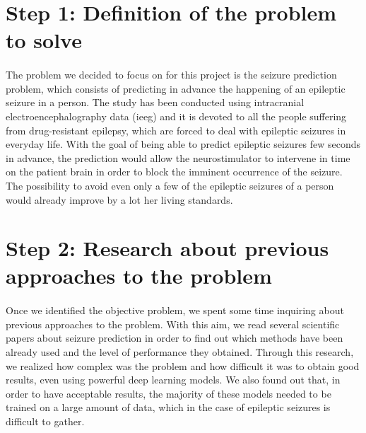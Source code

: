 
\section{Step 1: Definition of the problem to solve} \label{sec: step_definition_problem_to_solve}
\paragraph{} The problem we decided to focus on for this project is the seizure prediction problem, which consists of predicting in advance the happening of an epileptic seizure in a person. The study has been conducted using intracranial electroencephalography data (\acs{ieeg}) and it is devoted to all the people suffering from drug-resistant epilepsy, which are forced to deal with epileptic seizures in everyday life. With the goal of being able to predict epileptic seizures few seconds in advance, the prediction would allow the neurostimulator to intervene in time on the patient brain in order to block the imminent occurrence of the seizure. The possibility to avoid even only a few of the epileptic seizures of a person would already improve by a lot her living standards.


\section{Step 2: Research about previous approaches to the problem} \label{sec: step_research_about_previous_approaches}
\paragraph{} Once we identified the objective problem, we spent some time inquiring about previous approaches to the problem. With this aim, we read several scientific papers about seizure prediction in order to find out which methods have been already used and the level of performance they obtained. Through this research, we realized how complex was the problem and how difficult it was to obtain good results, even using powerful deep learning models. We also found out that, in order to have acceptable results, the majority of these models needed to be trained on a large amount of data, which in the case of epileptic seizures is difficult to gather.

